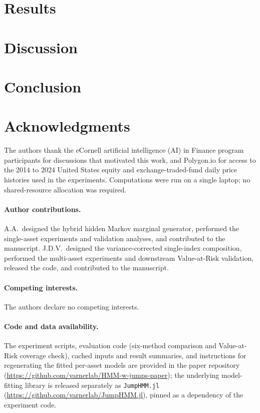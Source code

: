 \documentclass{article}
\theoremstyle{definition}
\theoremstyle{remark}
\begin{document}
\section{Results}\label{sec:results}


\section{Discussion}\label{sec:discussion}


\section{Conclusion}\label{sec:conclusion}


\section*{Acknowledgments}
The authors thank the eCornell artificial intelligence (AI) in Finance program participants for
discussions that motivated this work,
and Polygon.io for access to the 2014 to 2024 United States equity and
exchange-traded-fund daily
price histories used in the experiments. Computations were run on a
single laptop; no shared-resource allocation was required.

\paragraph{Author contributions.}
A.A.\ designed the hybrid hidden Markov marginal generator, performed the
single-asset experiments and validation analyses, and contributed to the
manuscript. J.D.V.\ designed the variance-corrected single-index
composition, performed the multi-asset experiments and downstream
Value-at-Risk validation, released the code, and contributed to the
manuscript.

\paragraph{Competing interests.}
The authors declare no competing interests.

\paragraph{Code and data availability.}
The experiment scripts, evaluation code (six-method comparison and
Value-at-Risk coverage check), cached inputs and
result summaries, and instructions for regenerating the fitted
per-asset models are provided in the paper repository
(\url{https://github.com/varnerlab/HMM-w-jumps-paper}); the
underlying model-fitting library is released separately as
\texttt{JumpHMM.jl}
(\url{https://github.com/varnerlab/JumpHMM.jl}), pinned as a
dependency of the experiment code.
\end{document}
